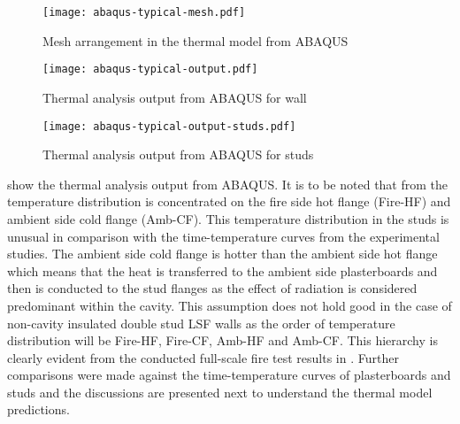 \begin{figure}[!htbp]
	\centering
		\texttt{[image: abaqus-typical-mesh.pdf]}
		\caption{Mesh arrangement in the thermal model from ABAQUS}
		\label{fig:abaqus-typical-mesh-thermal}
\end{figure}
\begin{figure}[!htbp]
	\centering
		\texttt{[image: abaqus-typical-output.pdf]}
		\caption{Thermal analysis output from ABAQUS for wall}
		\label{fig:abaqus-typical-output}
\end{figure}
\begin{figure}[!htbp]
	\centering
		\texttt{[image: abaqus-typical-output-studs.pdf]}
		\caption{Thermal analysis output from ABAQUS for studs}
		\label{fig:abaqus-typical-output-studs}
\end{figure}

 show the thermal analysis output from ABAQUS. It is to be noted that from  the temperature distribution is concentrated on the fire side hot flange (Fire-HF) and ambient side cold flange (Amb-CF). This temperature distribution in the studs is unusual in comparison with the time-temperature curves from the experimental studies. The ambient side cold flange is hotter than the ambient side hot flange which means that the heat is transferred to the ambient side plasterboards and then is conducted to the stud flanges as the effect of radiation is considered predominant within the cavity. This assumption does not hold good in the case of non-cavity insulated double stud LSF walls as the order of temperature distribution will be Fire-HF, Fire-CF, Amb-HF and Amb-CF. This hierarchy is clearly evident from the conducted full-scale fire test results in . Further comparisons were made against the time-temperature curves of plasterboards and studs and the discussions are presented next to understand the thermal model predictions.

